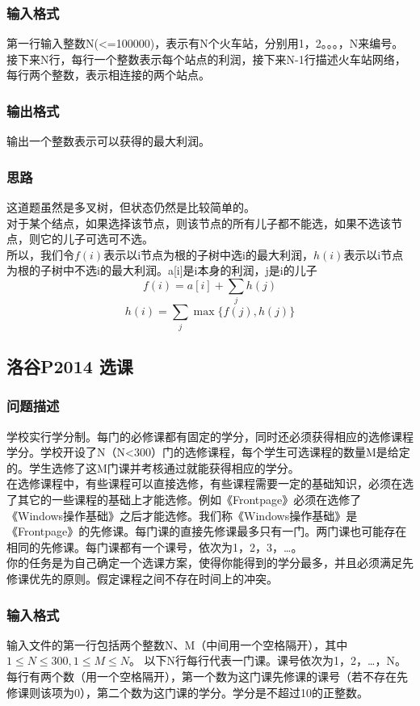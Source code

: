     \subsubsection{输入格式}
        第一行输入整数N(<=100000)，表示有N个火车站，分别用1，2。。。，N来编号。接下来N行，每行一个整数表示每个站点的利润，接下来N-1行描述火车站网络，每行两个整数，表示相连接的两个站点。
    \subsubsection{输出格式}
        输出一个整数表示可以获得的最大利润。
    \subsubsection{思路}
        这道题虽然是多叉树，但状态仍然是比较简单的。\\
        对于某个结点，如果选择该节点，则该节点的所有儿子都不能选，如果不选该节点，则它的儿子可选可不选。\\
        所以，我们令$f(i)$表示以i节点为根的子树中选i的最大利润，$h(i)$表示以i节点为根的子树中不选i的最大利润。a[i]是i本身的利润，j是i的儿子
        $$f(i)=a[i]+\sum_{j}{h(j)}$$
        $$h(i)=\sum_{j}{\max{\{f(j),h(j)\}}}$$

\subsection{洛谷P2014 选课}
    \subsubsection{问题描述}
        学校实行学分制。每门的必修课都有固定的学分，同时还必须获得相应的选修课程学分。学校开设了N（N<300）门的选修课程，每个学生可选课程的数量M是给定的。学生选修了这M门课并考核通过就能获得相应的学分。\\
        在选修课程中，有些课程可以直接选修，有些课程需要一定的基础知识，必须在选了其它的一些课程的基础上才能选修。例如《Frontpage》必须在选修了《Windows操作基础》之后才能选修。我们称《Windows操作基础》是《Frontpage》的先修课。每门课的直接先修课最多只有一门。两门课也可能存在相同的先修课。每门课都有一个课号，依次为1，2，3，…。\\
        你的任务是为自己确定一个选课方案，使得你能得到的学分最多，并且必须满足先修课优先的原则。假定课程之间不存在时间上的冲突。
    \subsubsection{输入格式}
        输入文件的第一行包括两个整数N、M（中间用一个空格隔开），其中$1\leq N\leq 300,1\leq M\leq N$。
        以下N行每行代表一门课。课号依次为1，2，…，N。每行有两个数（用一个空格隔开），第一个数为这门课先修课的课号（若不存在先修课则该项为0），第二个数为这门课的学分。学分是不超过10的正整数。
